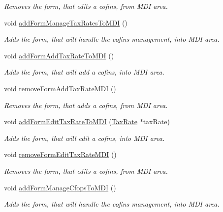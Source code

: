 \begin{DoxyCompactItemize}
\begin{DoxyCompactList}\small\item\em \-Removes the form, that edits a cofins, from \-M\-D\-I area. \end{DoxyCompactList}\item 
void \hyperlink{class_main_window_a817a704c164b878a8cfcebb2bfeee33b}{add\-Form\-Manage\-Tax\-Rates\-To\-M\-D\-I} ()
\begin{DoxyCompactList}\small\item\em \-Adds the form, that will handle the cofins management, into \-M\-D\-I area. \end{DoxyCompactList}\item 
void \hyperlink{class_main_window_a76dfcc4260d5e61f1809c7e1fa7093de}{add\-Form\-Add\-Tax\-Rate\-To\-M\-D\-I} ()
\begin{DoxyCompactList}\small\item\em \-Adds the form, that will add a cofins, into \-M\-D\-I area. \end{DoxyCompactList}\item 
void \hyperlink{class_main_window_a8f12644abaa86769a3b41204d278670e}{remove\-Form\-Add\-Tax\-Rate\-M\-D\-I} ()
\begin{DoxyCompactList}\small\item\em \-Removes the form, that adds a cofins, from \-M\-D\-I area. \end{DoxyCompactList}\item 
void \hyperlink{class_main_window_a4f7497e54a58bd71a0bb1712e42f3802}{add\-Form\-Edit\-Tax\-Rate\-To\-M\-D\-I} (\hyperlink{class_tax_rate}{\-Tax\-Rate} $\ast$tax\-Rate)
\begin{DoxyCompactList}\small\item\em \-Adds the form, that will edit a cofins, into \-M\-D\-I area. \end{DoxyCompactList}\item 
void \hyperlink{class_main_window_a25dad48bdb07068fe091061c3176aa90}{remove\-Form\-Edit\-Tax\-Rate\-M\-D\-I} ()
\begin{DoxyCompactList}\small\item\em \-Removes the form, that edits a cofins, from \-M\-D\-I area. \end{DoxyCompactList}\item 
void \hyperlink{class_main_window_a95ded70f88ab99f4d992693d003b2fbc}{add\-Form\-Manage\-Cfops\-To\-M\-D\-I} ()
\begin{DoxyCompactList}\small\item\em \-Adds the form, that will handle the cofins management, into \-M\-D\-I area. \end{DoxyCompactList}\item 

\end{DoxyCompactItemize}
